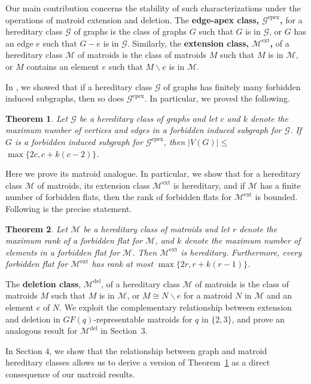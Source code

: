 \documentclass[11pt]{amsart}
\newtheorem{theorem}{Theorem}[section]
\theoremstyle{definition}
\theoremstyle{remark}
\numberwithin{equation}{section}
\newcommand\Me{\mathcal{M}^\mathrm{ext}}
\newcommand\Md{\mathcal{M}^\mathrm{del}}
\newcommand\Ga{\mathcal{G}^\mathrm{epex}}
\newcommand\ba{\backslash}
\begin{document}
Our main contribution concerns the stability of such characterizations under the operations of matroid extension and deletion. The {\bf edge-apex class, $\Ga$,} for a hereditary class $\mathcal{G}$ of graphs is the class of graphs $G$ such that $G$ is in $\mathcal{G}$, or $G$ has an edge $e$ such that $G-e$ is in $\mathcal{G}$.
Similarly, the {\bf extension class, $\Me$,} of a hereditary class $\mathcal{M}$ of matroids is the class of matroids $M$ such that $M$ is in $\mathcal{M}$, or $M$ contains an element $e$ such that $M \ba e$ is in $\mathcal{M}$. 

In \cite{sinsiv}, we showed that if a hereditary class $\mathcal{G}$ of graphs has finitely many forbidden induced subgraphs, then so does $\Ga$. In particular, we proved the following.

\begin{theorem}
\label{unique_FIS}
Let $\mathcal{G}$ be a hereditary class of graphs and let $c$ and $k$ denote the maximum number of vertices and edges in a forbidden induced subgraph for $\mathcal{G}$. If $G$ is a forbidden induced subgraph for $\Ga$, then $|V(G)| \leq$  $\max \{2c, c + k(c-2)\}$. 
\end{theorem}

Here we prove its matroid analogue. In particular, we show that for a hereditary class $\mathcal{M}$ of matroids, its extension class $\Me$ is hereditary, and if $\mathcal{M}$ has a finite number of forbidden flats, then the rank of forbidden flats for $\Me$ is bounded. Following is the precise statement. 

\begin{theorem}
\label{bound_k}
Let $\mathcal{M}$ be a hereditary class of matroids and let $r$ denote the maximum rank of a forbidden flat for  $\mathcal{M}$, and $k$ denote the maximum number of elements in a forbidden flat for  $\mathcal{M}$. Then $\Me$ is hereditary. Furthermore, every forbidden flat for $\Me$ has rank at most $\max \{2r, r + k(r-1)\}$.
\end{theorem}

The \textbf{deletion class}, $\Md$, of a hereditary class $\mathcal{M}$ of matroids is the class of matroids $M$ such that $M$ is in $\mathcal{M}$, or $M \cong N \ba e$ for a matroid $N$ in $\mathcal{M}$ and an element $e$ of $N$. We exploit the complementary relationship between extension and deletion in $GF(q)$-representable matroids for $q$ in $\{2, 3\}$, and prove an analogous result for $\Md$ in Section~$3$.

In Section $4$, we show that the relationship between graph and matroid hereditary classes allows us to derive a version of Theorem~\ref{unique_FIS} as a direct consequence of our matroid results.
\end{document}

